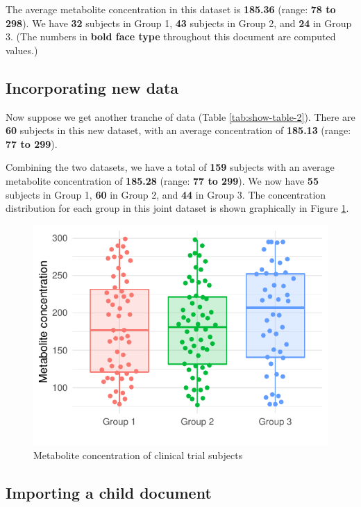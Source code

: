 \documentclass[smallextended]{svjour3}       %
\begin{document}
The average metabolite concentration in this dataset is \textbf{185.36} (range: \textbf{78 to 298}). We have \textbf{32} subjects in Group 1, \textbf{43} subjects in Group 2, and \textbf{24} in Group 3. (The numbers in \textbf{bold face type} throughout this document are computed values.)

\hypertarget{sec:2}{%
\subsection{Incorporating new data}\label{sec:2}}

Now suppose we get another tranche of data (Table \ref{tab:show-table-2}). There are \textbf{60} subjects in this new dataset, with an average concentration of \textbf{185.13} (range: \textbf{77 to 299}).

Combining the two datasets, we have a total of \textbf{159} subjects with an average metabolite concentration of \textbf{185.28} (range: \textbf{77 to 299}). We now have \textbf{55} subjects in Group 1, \textbf{60} in Group 2, and \textbf{44} in Group 3. The concentration distribution for each group in this joint dataset is shown graphically in Figure \ref{fig:plot-data-1}.

\begin{figure}
\centering
\includegraphics{computed_manuscript_files/figure-latex/plot-data-1-1.pdf}
\caption{\label{fig:plot-data-1}Metabolite concentration of clinical trial subjects}
\end{figure}

\hypertarget{importing-a-child-document}{%
\subsection{Importing a child document}\label{importing-a-child-document}}
\end{document}
